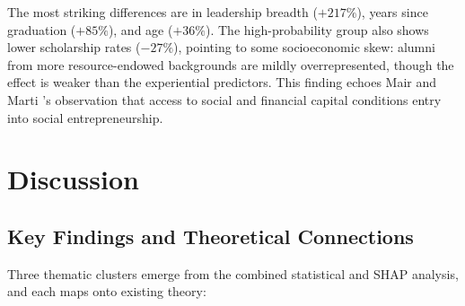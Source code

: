 \documentclass[10pt,twocolumn]{article}
\begin{document}
\begin{table}[H]
\centering
\caption{Numeric profile comparison: high-probability founders (top decile) vs.\ rest.}
\label{tab:profile}
\end{table}

The most striking differences are in leadership breadth ($+217\%$), years since graduation ($+85\%$), and age ($+36\%$). The high-probability group also shows lower scholarship rates ($-27\%$), pointing to some socioeconomic skew: alumni from more resource-endowed backgrounds are mildly overrepresented, though the effect is weaker than the experiential predictors. This finding echoes Mair and Marti \cite{oliveira2020}'s observation that access to social and financial capital conditions entry into social entrepreneurship.

\section{Discussion}
\label{sec:discussion}

\subsection{Key Findings and Theoretical Connections}

Three thematic clusters emerge from the combined statistical and SHAP analysis, and each maps onto existing theory:
\end{document}
